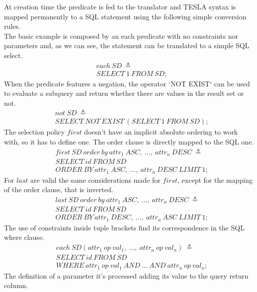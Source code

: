 At creation time the predicate is fed to the translator and TESLA syntax is mapped permanently to a SQL statement using the following simple conversion rules.\\
The basic example is composed by an each predicate with no constraints nor parameters and, as we can see, the statement can be translated to a simple SQL select.
\begin{align*}%
&each\ SD\ \triangleq\\
&SELECT\ 1\ FROM\ SD;
\end{align*}
When the predicate features a negation, the operator `NOT EXIST` can be used to evaluate a subquery and return whether there are values in the result set or not.
\begin{align*}%
&not\ SD\ \triangleq\\
&SELECT\ NOT\ EXIST\ (SELECT\ 1\ FROM\ SD);
\end{align*}
The selection policy $first$ doesn't have an implicit absolute ordering to work with, so it has to define one. The order clause is directly mapped to the SQL one.
\begin{align*}%
&first\ SD\ order\ by\ attr_1\ ASC,\ \ldots,\ attr_n\ DESC\ \triangleq\\
&SELECT\ id\ FROM\ SD\\
&ORDER\ BY\ attr_1\ ASC,\ \ldots,\ attr_n\ DESC\ LIMIT\ 1;
\end{align*}
For $last$ are valid the same considerations made for $first$, except for the mapping of the order clause, that is inverted.
\begin{align*}%
&last\ SD\ order\ by\ attr_1\ ASC,\ \ldots,\ attr_n\ DESC\ \triangleq\\
&SELECT\ id\ FROM\ SD\\
&ORDER\ BY\ attr_1\ DESC,\ \ldots,\ attr_n\ ASC\ LIMIT\ 1;
\end{align*}
The use of constraints inside tuple brackets find its correspondence in the SQL where clause.
\begin{align*}%
&each\ SD(attr_1\ op \ val_1,\ \ldots,\ attr_n\ op \ val_n)\ \triangleq\\
&SELECT\ id\ FROM\ SD\\
&WHERE\ attr_1\ op\ val_1\ AND\ \ldots\ AND\ attr_n\ op\ val_n;
\end{align*}
The definition of a parameter it's processed adding its value to the query return column.
